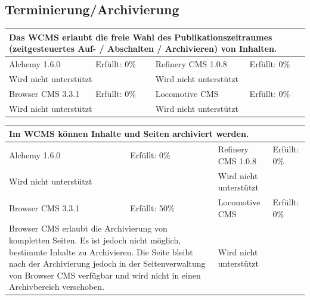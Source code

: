 \subsection{Terminierung/Archivierung}
\begin{tabular}[!ht]{|l|l|l|l|}
\hline
\multicolumn{4}{|p{15cm}|}{\textbf{Das WCMS erlaubt die freie Wahl des Publikationszeitraumes (zeitgesteuertes Auf- / Abschalten / Archivieren) von Inhalten.}} \\
\hline
  Alchemy 1.6.0 & \cellcolor{red}Erfüllt: 0\% & Refinery CMS 1.0.8 & \cellcolor{red}Erfüllt: 0\% \\
  \hline
  \multicolumn{2}{|p{7.5cm}|}{Wird nicht unterstützt} & \multicolumn{2}{p{7.5cm}|}{Wird nicht unterstützt} \\
  \hline
  Browser CMS 3.3.1 & \cellcolor{red}Erfüllt: 0\% & Locomotive CMS & \cellcolor{red}Erfüllt: 0\% \\
  \hline
  \multicolumn{2}{|p{7.5cm}|}{Wird nicht unterstützt} & \multicolumn{2}{p{7.5cm}|}{Wird nicht unterstützt} \\
\hline
\end{tabular}
\newline
\newline
\newline
\begin{tabular}[!ht]{|l|l|l|l|}
\hline
\multicolumn{4}{|p{15cm}|}{\textbf{Im WCMS können Inhalte und Seiten archiviert werden.}} \\
\hline
  Alchemy 1.6.0 & \cellcolor{red}Erfüllt: 0\% & Refinery CMS 1.0.8 & \cellcolor{red}Erfüllt: 0\% \\
  \hline
  \multicolumn{2}{|p{7.5cm}|}{Wird nicht unterstützt} & \multicolumn{2}{p{7.5cm}|}{Wird nicht unterstützt} \\
  \hline
  Browser CMS 3.3.1 & \cellcolor{yellow}Erfüllt: 50\% & Locomotive CMS & \cellcolor{red}Erfüllt: 0\% \\
  \hline
  \multicolumn{2}{|p{7.5cm}|}{Browser CMS erlaubt die Archivierung von kompletten Seiten. Es ist jedoch nicht möglich, bestimmte Inhalte zu Archivieren. Die Seite bleibt nach der Archivierung jedoch in der Seitenverwaltung von Browser CMS verfügbar und wird nicht in einen Archivbereich verschoben.} & \multicolumn{2}{p{7.5cm}|}{Wird nicht unterstützt} \\
\hline
\end{tabular}
\newline
\newline
\newline
